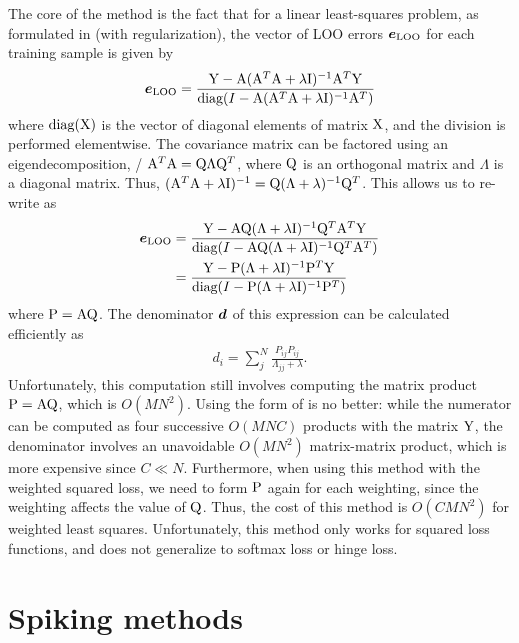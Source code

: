 The core of the method is the fact that for a linear least-squares problem,
as formulated in  (with regularization),
the vector of LOO errors $\boldsymbol{e}_\text{LOO}$
for each training sample is given by
\begin{align}
  \vect e_\text{LOO} = \frac{
    \mat Y - \mat A (\mat A^T \mat A + \lambda\mat I)^{-1} \mat A^T \mat Y}{
    \diag(I - \mat A (\mat A^T \mat A + \lambda\mat I)^{-1} \mat A^T)}
  \eqnlabel{rifkin}
\end{align}
where $\text{diag}(\mathrm{X})$ is the vector of diagonal elements of matrix $\mathrm{X}$,
and the division is performed elementwise.
The covariance matrix can be factored using an eigendecomposition,
\ie/ $\mathrm{A}^T \mathrm{A} = \mathrm{Q} \Lambda \mathrm{Q}^T$,
where $\mathrm{Q}$ is an orthogonal matrix and $\Lambda$ is a diagonal matrix.
Thus, $(\mathrm{A}^T \mathrm{A} + \lambda\mathrm{I})^{-1} = \mathrm{Q} (\Lambda + \lambda)^{-1} \mathrm{Q}^T$.
This allows us to re-write  as
\begin{align}
  \vect e_\text{LOO} &= \frac{
    \mat Y - \mat A \mat Q (\Lambda + \lambda\mat I)^{-1} \mat Q^T \mat A^T \mat Y}{
    \diag(I - \mat A \mat Q (\Lambda + \lambda\mat I)^{-1} \mat Q^T \mat A^T)}
  \eqnlabel{rifkin-eigen} \\
  &= \frac{
    \mat Y - \mat P (\Lambda + \lambda\mat I)^{-1} \mat P^T \mat Y}{
    \diag(I - \mat P (\Lambda + \lambda\mat I)^{-1} \mat P^T)}
\end{align}
where $\mathrm{P} = \mathrm{A} \mathrm{Q}$.
The denominator $\boldsymbol{d}$ of this expression can be calculated efficiently as
\begin{align}
  d_i = \sum_j^N \frac{P_{ij} P_{ij}}{\Lambda_{jj} + \lambda}.
\end{align}
Unfortunately, this computation still involves computing the matrix product
$\mathrm{P} = \mathrm{A} \mathrm{Q}$, which is $O(MN^2)$.
Using the form of  is no better:
while the numerator can be computed
as four successive $O(MNC)$ products with the matrix $\mathrm{Y}$,
the denominator involves an unavoidable $O(MN^2)$ matrix-matrix product,
which is more expensive since $C \ll N$.
Furthermore, when using this method with the weighted squared loss,
we need to form $\mathrm{P}$ again for each weighting,
since the weighting affects the value of $\mathrm{Q}$.
Thus, the cost of this method is $O(CMN^2)$ for weighted least squares.
Unfortunately, this method only works for squared loss functions,
and does not generalize to softmax loss or hinge loss.


\section{Spiking methods}

